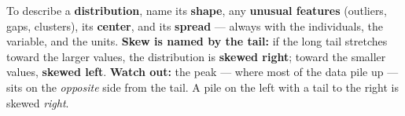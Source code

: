 \documentclass[12pt]{article}
\begin{document}
\vspace{0.14in}

\begin{remindbox}
\small
To describe a \textbf{distribution}, name its \textbf{shape}, any \textbf{unusual features}
(outliers, gaps, clusters), its \textbf{center}, and its \textbf{spread} --- always with the
individuals, the variable, and the units. \textbf{Skew is named by the tail:} if the long tail
stretches toward the larger values, the distribution is \textbf{skewed right}; toward the smaller
values, \textbf{skewed left}. \textbf{Watch out:} the peak --- where most of the data pile up ---
sits on the \emph{opposite} side from the tail. A pile on the left with a tail to the right is
skewed \emph{right}.
\end{remindbox}
\end{document}
